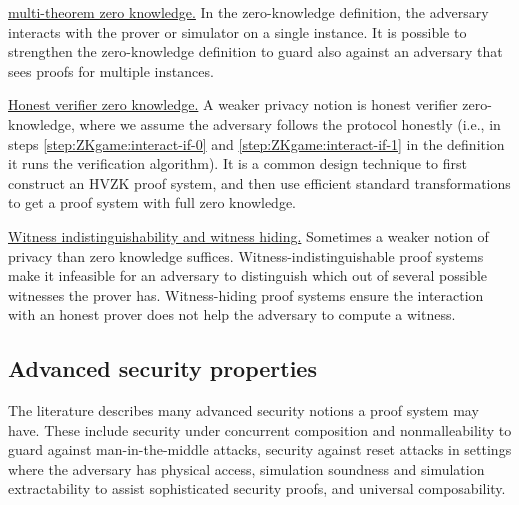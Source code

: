 

\underline{multi-theorem zero knowledge.} 
In the zero-knowledge definition, the adversary interacts with the prover or simulator on a single instance. 
It is possible to strengthen the zero-knowledge definition to guard also against an adversary that sees proofs for multiple instances.
 
\underline{Honest verifier zero knowledge.} 
	A weaker privacy notion is honest verifier zero-knowledge, where we assume the adversary follows the protocol honestly 
(i.e., in steps \ref{step:ZKgame:interact-if-0} and \ref{step:ZKgame:interact-if-1} in the definition it runs the verification algorithm). 
	It is a common design technique to first construct an HVZK proof system, and then use efficient standard transformations to get a proof system with full zero knowledge.
 
\underline{Witness indistinguishability and witness hiding.} 
Sometimes a weaker notion of privacy than zero knowledge suffices. 
Witness-indistinguishable proof systems make it infeasible for an adversary to distinguish which out of several possible witnesses the prover has. Witness-hiding proof systems ensure the interaction with an honest prover does not help the adversary to compute a witness.


\subsection{Advanced security properties}
\label{sec:security:defs-props:advanced-security-properties}

The literature describes many advanced security notions a proof system may have.
These include security under concurrent composition and nonmalleability to guard against man-in-the-middle attacks, security against reset attacks in settings where the adversary has physical access, simulation soundness and simulation extractability to assist sophisticated security proofs, and universal composability.
 
